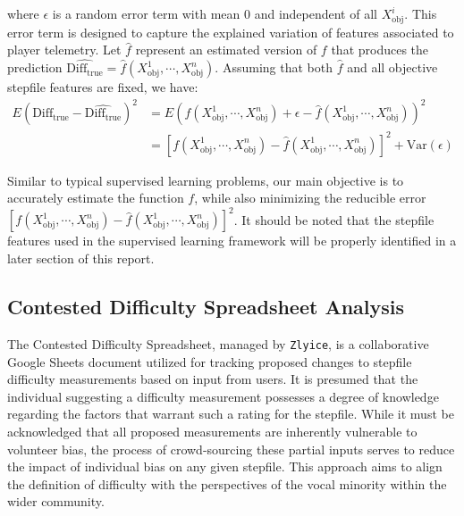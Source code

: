 where $\epsilon$ is a random error term with mean $0$ and independent of all $X_{\text{obj}}^i$. \cite{james2023introduction} This error term is designed to capture the explained variation of features associated to player telemetry. Let $\hat{f}$ represent an estimated version of $f$ that produces the prediction $\hat{\text{Diff}_{\text{true}}} = \hat{f}(X_{\text{obj}}^1, \cdots, X_{\text{obj}}^n)$. Assuming that both $\hat{f}$ and all objective stepfile features are fixed, we have:
\begin{align*}
    E(\text{Diff}_{\text{true}} - \hat{\text{Diff}_{\text{true}}})^2 & = E(f(X_{\text{obj}}^1, \cdots, X_{\text{obj}}^n) + \epsilon - \hat{f}(X_{\text{obj}}^1, \cdots, X_{\text{obj}}^n))^2 \\
    & = [f(X_{\text{obj}}^1, \cdots, X_{\text{obj}}^n) - \hat{f}(X_{\text{obj}}^1, \cdots, X_{\text{obj}}^n)]^2 + \text{Var}(\epsilon)
\end{align*}

Similar to typical supervised learning problems, our main objective is to accurately estimate the function $f$, while also minimizing the reducible error $[f(X_{\text{obj}}^1, \cdots, X_{\text{obj}}^n) - \hat{f}(X_{\text{obj}}^1, \cdots, X_{\text{obj}}^n)]^2$. It should be noted that the stepfile features used in the supervised learning framework will be properly identified in a later section of this report.


\subsection{Contested Difficulty Spreadsheet Analysis}

The Contested Difficulty Spreadsheet, managed by \texttt{Zlyice}, is a collaborative Google Sheets document utilized for tracking proposed changes to stepfile difficulty measurements based on input from users. It is presumed that the individual suggesting a difficulty measurement possesses a degree of knowledge regarding the factors that warrant such a rating for the stepfile. While it must be acknowledged that all proposed measurements are inherently vulnerable to volunteer bias, the process of crowd-sourcing these partial inputs serves to reduce the impact of individual bias on any given stepfile. This approach aims to align the definition of difficulty with the perspectives of the vocal minority within the wider community.

